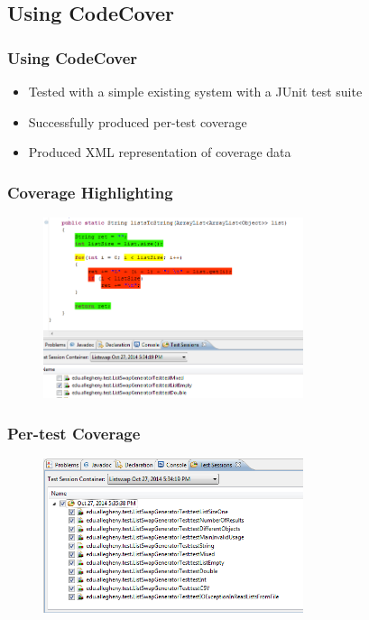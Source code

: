 \documentclass{beamer}
\begin{document}
	\subsection{Using CodeCover}
	\begin{frame}
	\frametitle{Using CodeCover}
	\begin{itemize}
    	\item Tested with a simple existing system with a JUnit test suite
    	\pause
    	\item Successfully produced per-test coverage
    	\pause
    	\item Produced XML representation of coverage data
	\end{itemize}
	\end{frame}
	\begin{frame}
	\frametitle{Coverage Highlighting}
	  	\begin{figure}
	  		\label{coverage}
	  		\includegraphics[width=3in]{img/codecovercoverage}
	  	\end{figure}
	\end{frame}
	\begin{frame}
	\frametitle{Per-test Coverage}
	  	\begin{figure}
	  		\label{ptcoverage}
	  		\includegraphics[width=3in]{img/codecoverpertest}
	  	\end{figure}
	\end{frame}
\end{document}
